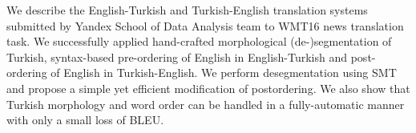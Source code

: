 We describe the English-Turkish and Turkish-English translation systems submitted by Yandex School of Data Analysis team to WMT16 news translation task. We successfully applied hand-crafted morphological (de-)segmentation of Turkish, syntax-based pre-ordering of English in English-Turkish and post-ordering of English in Turkish-English. We perform desegmentation using SMT and propose a simple yet efficient modification of postordering. We also show that Turkish morphology and word order can be handled in a fully-automatic manner with only a small loss of BLEU.

